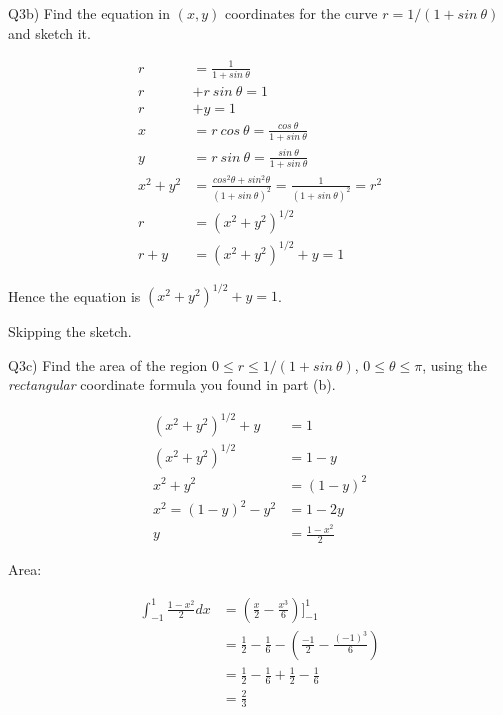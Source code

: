 \documentclass[9pt]{article}
\begin{document}
\begin{tcolorbox}
  Q3b) Find the equation in $(x, y)$ coordinates for the curve $r = 1 / (1 + sin\ \theta)$ and sketch it.
\end{tcolorbox}

\begin{align*}
  r &= \frac{1}{1 + sin\ \theta} \\
  r &+ r\ sin\ \theta = 1 \\
  r &+ y = 1 \\
  x &= r\ cos\ \theta = \frac{cos\ \theta}{1 + sin\ \theta} \\
  y &= r\ sin\ \theta = \frac{sin\ \theta}{1 + sin\ \theta} \\
  x^2 + y^2 &= \frac{cos^2 \theta + sin^2 \theta}{(1 + sin\ \theta)^2} = \frac{1}{(1 + sin\ \theta)^2} = r^2 \\
  r &= (x^2 + y^2)^{1/2} \\
  r + y &= (x^2 + y^2)^{1/2} + y = 1
\end{align*}

Hence the equation is $(x^2 + y^2)^{1/2} + y = 1$.

Skipping the sketch.


\begin{tcolorbox}
  Q3c) Find the area of the region $0 \leq r \leq 1 / (1 + sin\ \theta)$, $0 \leq \theta \leq \pi$, using the \textit{rectangular} coordinate formula you found in part (b).
\end{tcolorbox}

\begin{align*}
  (x^2 + y^2)^{1/2} + y &= 1 \\
  (x^2 + y^2)^{1/2} &= 1 - y \\
  x^2 + y^2 &= (1 - y)^2 \\
  x^2 = (1 - y)^2 - y^2 &= 1 - 2y \\
  y &= \frac{1 - x^2}{2}
\end{align*}

Area:

\begin{align*}
  \int_{-1}^1 \frac{1 - x^2}{2} dx &= (\frac{x}{2} - \frac{x^3}{6}) \bigg]_{-1}^1 \\
  &= \frac{1}{2} - \frac{1}{6} - (\frac{-1}{2} - \frac{(-1)^3}{6}) \\
  &= \frac{1}{2} - \frac{1}{6} + \frac{1}{2} - \frac{1}{6} \\
  &= \frac{2}{3}
\end{align*}
\end{document}

